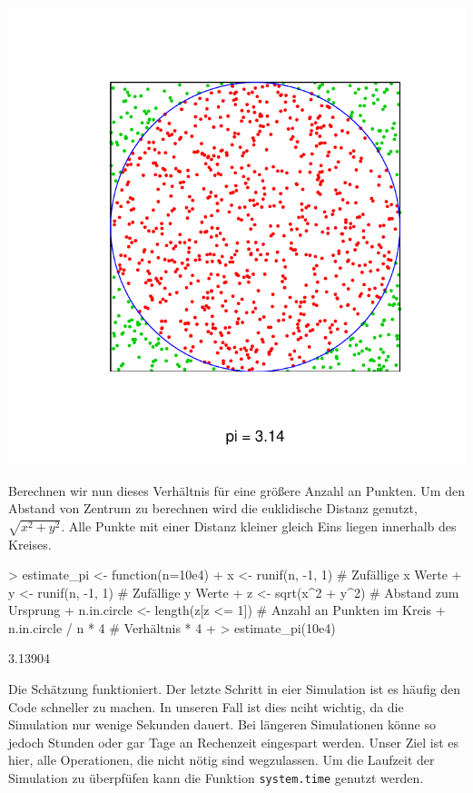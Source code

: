 \includegraphics{sim_pi-002}

Berechnen wir nun dieses Verhältnis für eine größere Anzahl an Punkten. Um den Abstand von Zentrum zu berechnen wird die euklidische Distanz genutzt, $\sqrt{x^2 + y^2}$. Alle Punkte mit einer Distanz kleiner gleich Eins liegen innerhalb des Kreises.
          
\begin{Schunk}
\begin{Sinput}
> estimate_pi <- function(n=10e4){
+   x <- runif(n, -1, 1)                # Zufällige x Werte 
+   y <- runif(n, -1, 1)                # Zufällige y Werte
+   z <- sqrt(x^2 + y^2)                # Abstand zum Ursprung
+   n.in.circle <- length(z[z <= 1])    # Anzahl an Punkten im Kreis
+   n.in.circle / n * 4                 # Verhältnis * 4
+ } 
> estimate_pi(10e4)
\end{Sinput}
\begin{Soutput}
[1] 3.13904
\end{Soutput}
\end{Schunk}

Die Schätzung funktioniert. Der letzte Schritt in eier Simulation ist es häufig den Code schneller zu machen. In unseren Fall ist dies nciht wichtig, da die Simulation nur wenige Sekunden dauert. Bei längeren Simulationen könne so jedoch Stunden oder gar Tage an Rechenzeit eingespart werden. Unser Ziel ist es hier, alle Operationen, die nicht nötig sind wegzulassen. Um die Laufzeit der Simulation zu überpfüfen kann die Funktion \texttt{system.time} genutzt werden.

